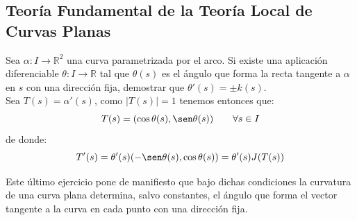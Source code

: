 \subsection{Teoría Fundamental de la Teoría Local de Curvas Planas}

\begin{ejercicio}
    Sea $\alpha:I\to\mathbb{R}^2$ una curva parametrizada por el arco. Si existe una aplicación diferenciable $\theta:I\to\mathbb{R}$ tal que $\theta(s)$ es el ángulo que forma la recta tangente a $\alpha$ en $s$ con una dirección fija, demostrar que $\theta'(s) = \pm k(s)$.\\

    \noindent
    Sea $T(s) = \alpha'(s)$, como $|T(s)| = 1$ tenemos entonces que:
    \begin{equation*}
        T(s) = (\cos\theta(s), \sen\theta(s)) \qquad \forall s\in I
    \end{equation*}
    de donde:
    \begin{equation*}
        T'(s) = \theta'(s)(-\sen\theta(s),\cos\theta(s)) = \theta'(s)J(T(s))
    \end{equation*}
\end{ejercicio}

\noindent
Este último ejercicio pone de manifiesto que bajo dichas condiciones la curvatura de una curva plana determina, salvo constantes, el ángulo que forma el vector tangente a la curva en cada punto con una dirección fija.

